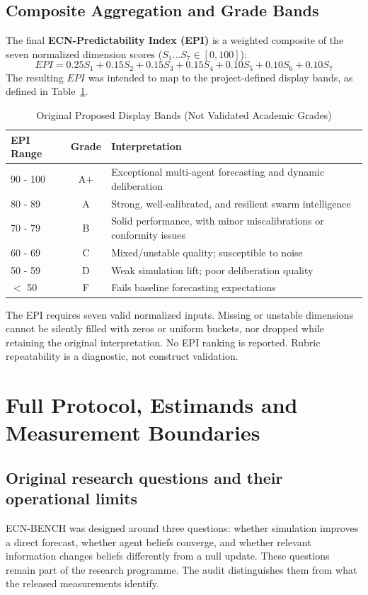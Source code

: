 \subsection{Composite Aggregation and Grade Bands}
The final \textbf{ECN-Predictability Index (EPI)} is a weighted composite of the seven normalized dimension scores ($S_1 \dots S_7 \in [0, 100]$):
\begin{equation}
    EPI = 0.25 S_1 + 0.15 S_2 + 0.15 S_3 + 0.15 S_4 + 0.10 S_5 + 0.10 S_6 + 0.10 S_7
\end{equation}
The resulting $EPI$ was intended to map to the project-defined display bands, as defined in Table~\ref{tab:grades}.

\begin{table}[!htbp]
\centering
\caption{Original Proposed Display Bands (Not Validated Academic Grades)}
\begin{tabular}{lcl}
\toprule
\textbf{EPI Range} & \textbf{Grade} & \textbf{Interpretation} \\
\midrule
90 - 100 & A+ & Exceptional multi-agent forecasting and dynamic deliberation \\
80 - 89  & A  & Strong, well-calibrated, and resilient swarm intelligence \\
70 - 79  & B  & Solid performance, with minor miscalibrations or conformity issues \\
60 - 69  & C  & Mixed/unstable quality; susceptible to noise \\
50 - 59  & D  & Weak simulation lift; poor deliberation quality \\
$<$ 50   & F  & Fails baseline forecasting expectations \\
\bottomrule
\end{tabular}
\label{tab:grades}
\end{table}


The EPI requires seven valid normalized inputs. Missing or unstable dimensions cannot be silently filled with zeros or uniform buckets, nor dropped while retaining the original interpretation. No EPI ranking is reported. Rubric repeatability is a diagnostic, not construct validation.



\section{Full Protocol, Estimands and Measurement Boundaries}
\label{sec:full_protocol}
\subsection{Original research questions and their operational limits}
ECN-BENCH was designed around three questions: whether simulation improves a direct forecast, whether agent beliefs converge, and whether relevant information changes beliefs differently from a null update. These questions remain part of the research programme. The audit distinguishes them from what the released measurements identify.

